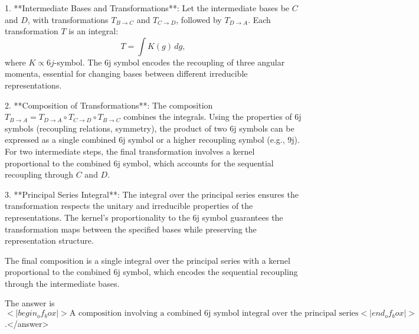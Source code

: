 1. **Intermediate Bases and Transformations**: Let the intermediate bases be \( C \) and \( D \), with transformations \( T_{B \to C} \) and \( T_{C \to D} \), followed by \( T_{D \to A} \). Each transformation \( T \) is an integral:  
   \[
   T = \int K(g) \, dg,
   \]  
   where \( K \propto 6j \)-symbol. The 6j symbol encodes the recoupling of three angular momenta, essential for changing bases between different irreducible representations.  

2. **Composition of Transformations**: The composition \( T_{B \to A} = T_{D \to A} \circ T_{C \to D} \circ T_{B \to C} \) combines the integrals. Using the properties of 6j symbols (recoupling relations, symmetry), the product of two 6j symbols can be expressed as a single combined 6j symbol or a higher recoupling symbol (e.g., 9j). For two intermediate steps, the final transformation involves a kernel proportional to the combined 6j symbol, which accounts for the sequential recoupling through \( C \) and \( D \).  

3. **Principal Series Integral**: The integral over the principal series ensures the transformation respects the unitary and irreducible properties of the representations. The kernel’s proportionality to the 6j symbol guarantees the transformation maps between the specified bases while preserving the representation structure.  

The final composition is a single integral over the principal series with a kernel proportional to the combined 6j symbol, which encodes the sequential recoupling through the intermediate bases.  

The answer is \(<|begin_of_box|>\text{A composition involving a combined 6j symbol integral over the principal series}<|end_of_box|>\).</answer>